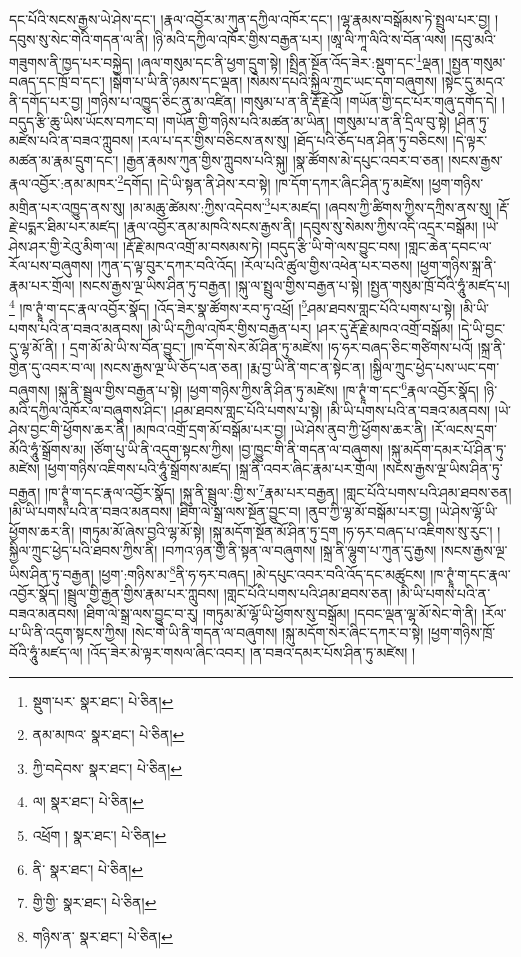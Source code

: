 དང་པོའི་སངས་རྒྱས་ཡེ་ཤེས་དང་། །རྣལ་འབྱོར་མ་ཀུན་དཀྱིལ་འཁོར་དང་། །ལྷ་རྣམས་བསྒོམས་ཏེ་སྤྲུལ་པར་བྱ། །དབུས་སུ་སེང་གེའི་གདན་ལ་ནི། །ཉི་མའི་དཀྱིལ་འཁོར་གྱིས་བརྒྱན་པར། །ཨཱ་ལི་ཀཱ་ལིའི་ས་བོན་ལས། །དབུ་མའི་གཟུགས་ནི་ཁྱད་པར་བསྐྱེད། །ཞལ་གསུམ་དང་ནི་ཕྱག་དྲུག་སྟེ། །སྤྲིན་སྔོན་འོད་ཟེར་:སྡུག་དང་\footnote{སྡུག་པར་  སྣར་ཐང་།  པེ་ཅིན། }ལྡན། །སྤྱན་གསུམ་བཞད་དང་ཁྲོ་བ་དང་། །སྒེག་པ་ཡི་ནི་ཉམས་དང་ལྡན། །སེམས་དཔའི་སྐྱིལ་ཀྲུང་ཡང་དག་བཞུགས། །སྟེང་དུ་མདའ་ནི་དགོད་པར་བྱ། །གཉིས་པ་འཁྱུད་ཅིང་ནུ་མ་འཛིན། །གསུམ་པ་ན་ནི་རྡོ་རྗེའོ། །གཡོན་གྱི་དང་པོར་གཞུ་དགོད་དེ། །བདུད་རྩི་ཆུ་ཡིས་ཡོངས་བཀང་བ། །གཡོན་གྱི་གཉིས་པའི་མཚན་མ་ཡིན། །གསུམ་པ་ན་ནི་དྲིལ་བུ་སྟེ། །ཤིན་ཏུ་མཛེས་པའི་ན་བཟའ་ཀླུབས། །རལ་པ་དར་གྱིས་བཅིངས་ནས་སུ། །ཐོད་པའི་ཅོད་པན་ཤིན་ཏུ་བཅིངས། །དེ་ལྟར་མཚན་མ་རྣམ་དྲུག་དང་། །རྒྱན་རྣམས་ཀུན་གྱིས་ཀླུབས་པའི་སྐུ། །སྣ་ཚོགས་མེ་དཔུང་འབར་བ་ཅན། །སངས་རྒྱས་རྣལ་འབྱོར་:ནམ་མཁར་\footnote{ནམ་མཁའ་  སྣར་ཐང་།  པེ་ཅིན། }དགོད། །དེ་ཡི་སྟན་ནི་ཤེས་རབ་སྟེ། །ཁ་དོག་དཀར་ཞིང་ཤིན་ཏུ་མཛེས། །ཕྱག་གཉིས་མགྲིན་པར་འཁྱུད་ནས་སུ། །མ་མཆུ་ཚེམས་:ཀྱིས་འདེབས་\footnote{ཀྱི་བདེབས་  སྣར་ཐང་།  པེ་ཅིན། }པར་མཛད། །ཞབས་ཀྱི་ཚིགས་ཀྱིས་དཀྲིས་ནས་སུ། །རྡོ་རྗེ་པདྨར་ཐིམ་པར་མཛད། །རྣལ་འབྱོར་ནམ་མཁའི་སངས་རྒྱས་ནི། །དབུས་སུ་སེམས་ཀྱིས་འདི་འདྲར་བསྒོམ། །ཡེ་ཤེས་ཤར་གྱི་རེའུ་མིག་ལ། །རྡོ་རྗེ་མཁའ་འགྲོ་མ་བསམས་ཏེ། །བདུད་རྩི་ཡི་གེ་ལས་བྱུང་བས། །གླང་ཆེན་དབང་ལ་རོལ་པས་བཞུགས། །ཀུན་ད་ལྟ་བུར་དཀར་བའི་འོད། །རོལ་པའི་ཚུལ་གྱིས་འཕེན་པར་བཅས། །ཕྱག་གཉིས་སྐྲ་ནི་རྣམ་པར་གྲོལ། །སངས་རྒྱས་ལྔ་ཡིས་ཤིན་ཏུ་བརྒྱན། །སྐུ་ལ་སྤྲུལ་གྱིས་བརྒྱན་པ་སྟེ། །སྤྱན་གསུམ་ཁྲོ་བོའི་ཧཱུཾ་མཛད་པ།\footnote{ལ།  སྣར་ཐང་།  པེ་ཅིན། } །ཁ་ཊྭཱཾ་ག་དང་རྣལ་འབྱོར་སྣོད། །འོད་ཟེར་སྣ་ཚོགས་རབ་ཏུ་འཕྲོ། །\footnote{འཕྲོག །  སྣར་ཐང་།  པེ་ཅིན། }ཤམ་ཐབས་གླང་པོའི་པགས་པ་སྟེ། །མི་ཡི་པགས་པའི་ན་བཟའ་མནབས། །མེ་ཡི་དཀྱིལ་འཁོར་གྱིས་བརྒྱན་པར། །ཤར་དུ་རྡོ་རྗེ་མཁའ་འགྲོ་བསྒོམ། །དེ་ཡི་བྱང་དུ་ལྷ་མོ་ནི། །
དྲག་མོ་མེ་ཡི་ས་བོན་བྱུང་། །ཁ་དོག་སེར་མོ་ཤིན་ཏུ་མཛེས། །ཧ་ཧར་བཞད་ཅིང་གཙིགས་པའོ། །སྐྲ་ནི་གྱེན་དུ་འབར་བ་ལ། །སངས་རྒྱས་ལྔ་ཡི་ཅོད་པན་ཅན། །རྨ་བྱ་ཡི་ནི་གང་ན་སྟེང་ན། །སྐྱིལ་ཀྲུང་ཕྱེད་པས་ཡང་དག་བཞུགས། །སྐུ་ནི་སྦྲུལ་གྱིས་བརྒྱན་པ་སྟེ། །ཕྱག་གཉིས་ཀྱིས་ནི་ཤིན་ཏུ་མཛེས། །ཁ་ཊྭཱཾ་ག་དང་\footnote{ནི་  སྣར་ཐང་།  པེ་ཅིན། }རྣལ་འབྱོར་སྣོད། །ཉི་མའི་དཀྱིལ་འཁོར་ལ་བཞུགས་ཤིང་། །ཤམ་ཐབས་གླང་པོའི་པགས་པ་སྟེ། །མི་ཡི་པགས་པའི་ན་བཟའ་མནབས། །ཡེ་ཤེས་བྱང་གི་ཕྱོགས་ཆར་ནི། །མཁའ་འགྲོ་དྲག་མོ་བསྒོམ་པར་བྱ། །ཡེ་ཤེས་ནུབ་ཀྱི་ཕྱོགས་ཆར་ནི། །རོ་ལངས་དྲག་མོའི་ཧཱུཾ་སྒྲོགས་མ། །ཙོག་པུ་ཡི་ནི་འདུག་སྟངས་ཀྱིས། །བྱ་ཁྱུང་གི་ནི་གདན་ལ་བཞུགས། །སྐུ་མདོག་དམར་པོ་ཤིན་ཏུ་མཛེས། །ཕྱག་གཉིས་འཇིགས་པའི་ཧཱུཾ་སྒྲོགས་མཛད། །སྐྲ་ནི་འབར་ཞིང་རྣམ་པར་གྲོལ། །སངས་རྒྱས་ལྔ་ཡིས་ཤིན་ཏུ་བརྒྱན། །ཁ་ཊྭཱཾ་ག་དང་རྣལ་འབྱོར་སྣོད། །སྐུ་ནི་སྦྲུལ་:གྱི་ས་\footnote{གྱི་གྱི་  སྣར་ཐང་།  པེ་ཅིན། }རྣམ་པར་བརྒྱན། །གླང་པོའི་པགས་པའི་ཤམ་ཐབས་ཅན། །མི་ཡི་པགས་པའི་ན་བཟའ་མནབས། །ཐིག་ལེ་སྒྲ་ལས་སྔོན་བྱུང་བ། །ནུབ་ཀྱི་ལྷ་མོ་བསྒོམ་པར་བྱ། །ཡེ་ཤེས་ལྷོ་ཡི་ཕྱོགས་ཆར་ནི། །གཏུམ་མོ་ཞེས་བྱའི་ལྷ་མོ་སྟེ། །སྐུ་མདོག་སྔོན་མོ་ཤིན་ཏུ་དྲག །ཧ་ཧར་བཞད་པ་འཇིགས་སུ་རུང་། །སྐྱིལ་ཀྲུང་ཕྱེད་པའི་ཐབས་ཀྱིས་ནི། །བཀའ་ཉན་གྱི་ནི་སྟན་ལ་བཞུགས། །སྐྲ་ནི་ལྷུག་པ་ཀུན་དུ་རྒྱས། །སངས་རྒྱས་ལྔ་ཡིས་ཤིན་ཏུ་བརྒྱན། །ཕྱག་:གཉིས་མ་\footnote{གཉིས་ན་  སྣར་ཐང་།  པེ་ཅིན། }ནི་ཧ་ཧར་བཞད། །མེ་དཔུང་འབར་བའི་འོད་དང་མཚུངས། །ཁ་ཊྭཱཾ་ག་དང་རྣལ་འབྱོར་སྣོད། །སྦྲུལ་གྱི་རྒྱན་གྱིས་རྣམ་པར་ཀླུབས། །གླང་པོའི་པགས་པའི་ཤམ་ཐབས་ཅན། །མི་ཡི་པགས་པའི་ན་བཟའ་མནབས། །ཐིག་ལེ་སྒྲ་ལས་བྱུང་བ་རུ། །གཏུམ་མོ་ལྷོ་ཡི་ཕྱོགས་སུ་བསྒོམ། །དབང་ལྡན་ལྷ་མོ་སེང་གེ་ནི། །རོལ་པ་ཡི་ནི་འདུག་སྟངས་ཀྱིས། །སེང་གེ་ཡི་ནི་གདན་ལ་བཞུགས། །སྐུ་མདོག་སེར་ཞིང་དཀར་བ་སྟེ། །ཕྱག་གཉིས་ཁྲོ་བོའི་ཧཱུཾ་མཛད་ལ། །འོད་ཟེར་མེ་ལྟར་གསལ་ཞིང་འབར། །ན་བཟའ་དམར་པོས་ཤིན་ཏུ་མཛེས། །
